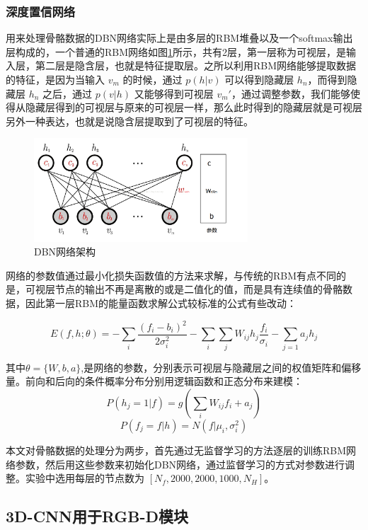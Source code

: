 \documentclass[a4paper, 12pt]{article}
\begin{document}
\subsubsection{深度置信网络}
用来处理骨骼数据的DBN网络实际上是由多层的RBM堆叠以及一个softmax输出层构成的，一个普通的RBM网络如图\ref{fig:rbn}所示，共有2层，第一层称为可视层，是输入层，第二层是隐含层，也就是特征提取层。之所以利用RBM网络能够提取数据的特征，是因为当输入 $v_m$ 的时候，通过 $p(h|v)$ 可以得到隐藏层 $h_n$，而得到隐藏层 $h_n$ 之后，通过 $p(v|h)$ 又能够得到可视层 $v_m'$，通过调整参数，我们能够使得从隐藏层得到的可视层与原来的可视层一样，那么此时得到的隐藏层就是可视层另外一种表达，也就是说隐含层提取到了可视层的特征。
\begin{figure}[ht]
  \centering
  \includegraphics[width=8cm]{RBM.png}
  \caption{\label{fig:rbn}DBN网络架构}
\end{figure}

网络的参数值通过最小化损失函数值的方法来求解，与传统的RBM有点不同的是，可视层节点的输出不再是离散的或是二值化的值，而是具有连续值的骨骼数据，因此第一层RBM的能量函数求解公式较标准的公式有些改动：

\begin{equation}
  E(f,h;\theta) = -\sum_i{\frac{(f_i-b_i)^2}{2\sigma_i^2}} - \sum_i{}\sum_j{W_{ij}h_j\frac{f_i}{\sigma_i}} - \sum_{j=1}{a_jh_j}
\end{equation}

其中$\theta=\{W,b,a\}$,是网络的参数，分别表示可视层与隐藏层之间的权值矩阵和偏移量。前向和后向的条件概率分布分别用逻辑函数和正态分布来建模：
\begin{equation}
  P(h_j=1|f) = g(\sum_i{W_{ij}f_i+a_j})
\end{equation}
\begin{equation}
  P(f_j=f|h) = N(f|\mu_i,\sigma^2_i)
\end{equation}


本文对骨骼数据的处理分为两步，首先通过无监督学习的方法逐层的训练RBM网络参数，然后用这些参数来初始化DBN网络，通过监督学习的方式对参数进行调整。实验中选用每层的节点数为 $[N_f,2000,2000,1000,N_H]$。

\subsection{3D-CNN用于RGB-D模块}
\end{document}
